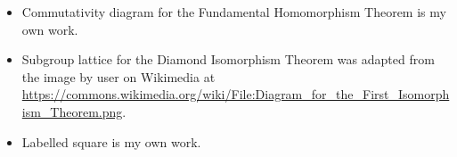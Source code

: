 \begin{itemize}
    \item Commutativity diagram for the Fundamental Homomorphism Theorem is my own work.
    \item Subgroup lattice for the Diamond Isomorphism Theorem was adapted from the image by user  on Wikimedia at \url{https://commons.wikimedia.org/wiki/File:Diagram_for_the_First_Isomorphism_Theorem.png}.
\end{itemize}

\begin{itemize}
    \item Labelled square is my own work.
\end{itemize}

\printbibliography[heading=bibintoc, title={References and Bibliography}]


